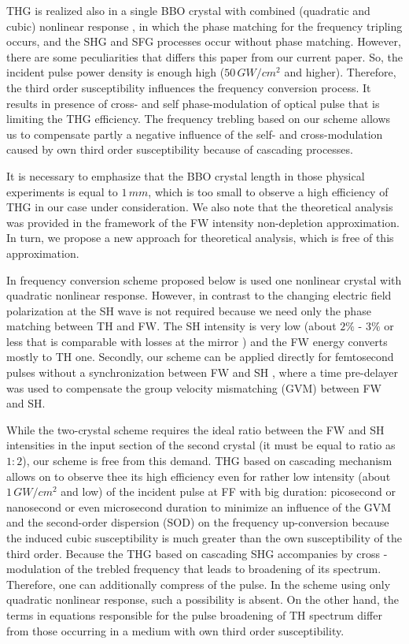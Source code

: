 \documentclass[a4paper, 12pt, onecolumn]{extarticle}
\begin{document}
THG is realized also in a single BBO crystal with combined (quadratic and cubic) nonlinear response  \cite{bib:t1}, in which the phase matching for the frequency tripling occurs, and the SHG and SFG processes occur without phase matching. However, there are some peculiarities that differs this paper from our current paper. So, the incident pulse power density is enough high (\(50\,GW/cm^2\) and higher). Therefore, the third order susceptibility influences the frequency conversion process. It results in presence of cross- and self phase-modulation of optical pulse that is limiting the THG efficiency.  The  frequency trebling based on our scheme allows us to compensate partly a negative influence of the self- and cross-modulation caused by own third order susceptibility because of cascading processes. 

It is necessary to emphasize that the BBO crystal length in those physical experiments is equal to \(1\,mm\), which is too small to observe a high efficiency of THG in our case under consideration. We also note that the theoretical analysis was provided in the framework of the FW intensity non-depletion approximation. In turn, we propose a new approach for theoretical analysis, which is free of this approximation. 

In frequency conversion scheme proposed below is used one nonlinear crystal with quadratic nonlinear response. However, in  contrast to \cite{bib:t4} the changing  electric field polarization at the SH wave is not required because we need only the phase matching between TH and FW. The SH intensity is very low (about $2\%$ - $3\%$ or less that is comparable with losses at the mirror \cite{bib:t4a,bib:t4}) and the FW energy converts mostly to TH one. Secondly, our scheme can be applied directly for femtosecond pulses without a synchronization between  FW and SH \cite{bib:t5}, where a time pre-delayer was used to compensate the group velocity mismatching (GVM) between FW and SH. 

While the two-crystal scheme requires the ideal ratio between the FW and SH intensities in the input section of the second crystal (it must be equal to ratio as $1:2$), our scheme is free from this demand. THG based on cascading mechanism  allows on to observe thee its high efficiency even for rather low intensity (about \(1\,GW/cm^2\) and low) of the incident pulse at FF with big duration: picosecond or  nanosecond or  even microsecond duration to minimize an  influence of the GVM  and the second-order dispersion (SOD) on the frequency up-conversion because the induced cubic susceptibility is much greater than the own susceptibility of the third order.
Because  the THG based on cascading SHG accompanies by  cross -modulation of the trebled frequency that leads to broadening of its spectrum. Therefore, one can additionally compress of the pulse. In the scheme using only quadratic nonlinear response, such a possibility is absent.  On the other hand, the terms in equations responsible for the pulse broadening of TH spectrum  differ from those occurring in a medium with own third order susceptibility. 
\end{document}
